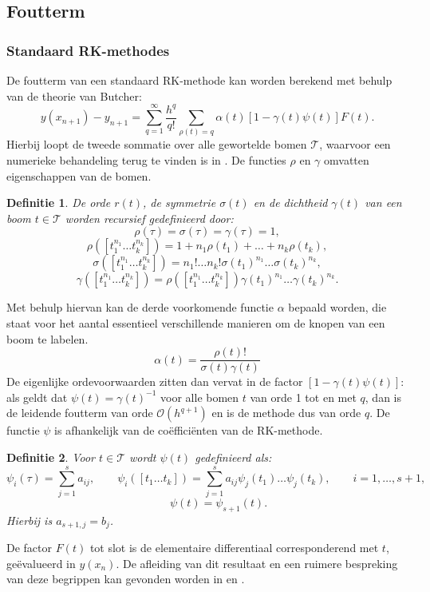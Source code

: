 \documentclass[12pt]{article}
\newtheorem{defn}{Definitie}
\begin{document}
\subsection{Foutterm}
\subsubsection{Standaard RK-methodes}
De foutterm van een standaard RK-methode kan worden berekend met behulp van de theorie van Butcher:
\begin{equation} \label{eq:standarderror}
    y(x_{n+1})-y_{n+1}=\sum_{q=1}^\infty\frac{h^q}{q!}\sum_{\rho(t)=q}\alpha(t)[1-\gamma(t)\psi(t)]F(t).
\end{equation}
Hierbij loopt de tweede sommatie over alle gewortelde bomen \(\mathcal{T}\), waarvoor een numerieke behandeling terug te vinden is in \cite{gnm}. De functies \(\rho\) en \(\gamma\) omvatten eigenschappen van de bomen.
\begin{defn} \label{def:treeprop}
    De orde \(r(t)\), de symmetrie \(\sigma(t)\) en de dichtheid \(\gamma(t)\) van een boom \(t\in\mathcal{T}\) worden recursief gedefinieerd door:
    \[\rho(\tau)=\sigma(\tau)=\gamma(\tau)=1,\]
    \[\rho([t^{n_1}_1\dots t^{n_k}_k])=1+n_1\rho(t_1)+\dots+n_k\rho(t_k),\]
    \[\sigma([t^{n_1}_1\dots t^{n_k}_k])=n_1!\dots n_k!\sigma(t_1)^{n_1}\dots\sigma(t_k)^{n_k},\]
    \[\gamma([t^{n_1}_1\dots t^{n_k}_k])=\rho([t^{n_1}_1\dots t^{n_k}_k])\gamma(t_1)^{n_1}\dots\gamma(t_k)^{n_k}.\]
\end{defn}
Met behulp hiervan kan de derde voorkomende functie \(\alpha\) bepaald worden, die staat voor het aantal essentieel verschillende manieren om de knopen van een boom te labelen.
\[\alpha(t)=\frac{\rho(t)!}{\sigma(t)\gamma(t)}\]
De eigenlijke ordevoorwaarden zitten dan vervat in de factor \([1-\gamma(t)\psi(t)]\): als geldt dat \(\psi(t)=\gamma(t)^{-1}\) voor alle bomen \(t\) van orde 1 tot en met \(q\), dan is  de leidende foutterm van orde \(\mathcal{O}(h^{q+1})\) en is de methode dus van orde \(q\). De functie \(\psi\) is afhankelijk van de coëfficiënten van de RK-methode.
\begin{defn} \label{def:psi}
Voor \(t\in\mathcal{T}\) wordt \(\psi(t)\) gedefinieerd als:
\[\psi_i(\tau)=\sum_{j=1}^sa_{ij},\qquad\psi_i([t_1\dots t_k])=\sum_{j=1}^sa_{ij}\psi_j(t_1)\dots\psi_j(t_k),\qquad i=1,\dots,s+1,\]
\[\qquad\psi(t)=\psi_{s+1}(t).\]
Hierbij is \(a_{s+1,j}=b_j\).
\end{defn}
De factor \(F(t)\) tot slot is de elementaire differentiaal corresponderend met \(t\), geëvalueerd in \(y(x_n)\). De afleiding van dit resultaat en een ruimere bespreking van deze begrippen kan gevonden worden in \cite{butchertheory} en \cite{gnm}.
\end{document}
